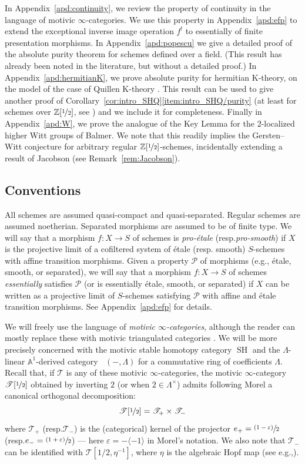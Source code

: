 \documentclass[11pt]{article}
\newcommand{\eg}{e.g.,\xspace}
\newcommand{\resp}{resp.\xspace}
\numberwithin{equation}{section}\renewcommand{\encodingdefault}{TU}
\newcommand{\psfrac}[2]{\sfrac{(#1)}{#2}}
\let\epsilon\varepsilon
\newcommand{\T}{\mathscr T}
\renewcommand{\AA}{\mathbb A}
\DeclareMathOperator{\SH}{SH}
\DeclareMathOperator{\DA}{D_{\AA^1}}
\newcommand{\ZZot} {\mathbb Z[\nicefrac 1 2]}
\newcommand{\ot} {{\nicefrac 1 2}}
\theoremstyle{remark}
\theoremstyle{definition}
\numberwithin{equation}{thm}
\begin{document}
In Appendix~\ref{apd:continuity}, we review the property of continuity in the language of motivic $\infty$-categories.
We use this property in Appendix~\ref{apd:efp} to extend the exceptional inverse image operation $f^!$ to essentially of finite presentation morphisms.
In Appendix~\ref{apd:popescu} we give a detailed proof of the absolute purity theorem for schemes defined over a field. (This result has already been noted in the literature, but without a detailed proof.)
In Appendix~\ref{apd:hermitianK}, we prove absolute purity for hermitian K-theory,
on the model of the case of Quillen K-theory \cite[Th.\,13.6.3]{CD3}.
This result can be used to give another proof of Corollary~\ref{cor:intro_SHQ}\eqref{item:intro_SHQ/purity} (at least for schemes over $\ZZot$, see \cite{DFJKBorel}) and we include it for completeness.
Finally in Appendix~\ref{apd:W}, we prove the analogue of the Key Lemma for the $2$-localized higher Witt groups of Balmer.
We note that this readily implies the Gersten--Witt conjecture for arbitrary regular $\ZZot$-schemes,
incidentally extending a result of Jacobson (see Remark~\ref{rem:Jacobson}).

\subsection*{Conventions}

All schemes are assumed quasi-compact and quasi-separated.
Regular schemes are assumed noetherian.
Separated morphisms are assumed to be of finite type.
We will say that a morphism $f:X \to S$ of schemes is \emph{pro-étale} (\resp \emph{pro-smooth}) if $X$ is the projective limit of a cofiltered system of étale (\resp smooth) $S$-schemes with affine transition morphisms.
Given a property $\mathcal P$ of morphisms (\eg étale, smooth, or separated), we will say that a morphism $f:X \to S$ of schemes \emph{essentially} satisfies $\mathcal P$ (or is essentially étale, smooth, or separated) if $X$ can be written as a projective limit of $S$-schemes satisfying $\mathcal P$ with affine and étale transition morphisms.
See Appendix~\ref{apd:efp} for details.

We will freely use the language of \emph{motivic $\infty$-categories}, although the reader can mostly replace these with motivic triangulated categories \cite{CD3}.
We will be more precisely concerned with the motivic stable homotopy category $\SH$ and the $\Lambda$-linear $\AA^1$-derived category $\DA(-,\Lambda)$ for a commutative ring of coefficients $\Lambda$.
Recall that, if $\T$ is any of these motivic $\infty$-categories,
the motivic $\infty$-category $\T[\ot]$ obtained by inverting $2$ (or when $2 \in \Lambda^\times$) admits
following Morel a canonical orthogonal decomposition:
\begin{equation*}\label{eq:+-decomposition}
\T[\ot] = \T_+ \times \T_-
\end{equation*}
where $\T_+$ (\resp $\T_-$) is the (categorical) kernel of the projector
$e_+=\psfrac{1-\epsilon} 2$ (\resp $e_-=\psfrac{1+\epsilon} 2$)
--- here $\epsilon=-\langle -1\rangle$ in Morel's notation.
We also note that $\T_-$ can be identified with $\T[1/2,\eta^{-1}]$, where $\eta$ is the algebraic Hopf map (see \eg \cite[Rem.\,3.6]{ALP}).
\end{document}
